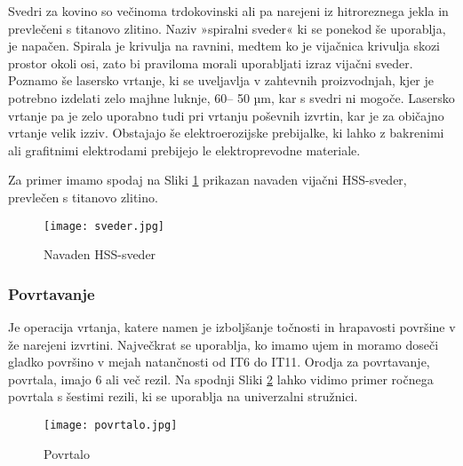 Svedri za kovino so večinoma trdokovinski ali pa narejeni iz
hitroreznega jekla in prevlečeni s titanovo zlitino.
Naziv »spiralni sveder« ki se ponekod še uporablja, je napačen.
Spirala je krivulja na ravnini, medtem ko je vijačnica krivulja
skozi prostor okoli osi, zato bi praviloma morali uporabljati
izraz vijačni sveder.
Poznamo še lasersko vrtanje, ki se uveljavlja v zahtevnih
proizvodnjah, kjer je potrebno izdelati zelo majhne luknje,
60-- 50 µm, kar s svedri ni mogoče. Lasersko vrtanje pa je zelo
uporabno tudi pri vrtanju poševnih izvrtin, kar je za običajno
vrtanje velik izziv.
Obstajajo še elektroerozijske prebijalke, ki lahko z bakrenimi ali
grafitnimi elektrodami prebijejo le elektroprevodne materiale.

Za primer imamo spodaj na Sliki \ref{hss_sveder} prikazan navaden
vijačni HSS-sveder, prevlečen s titanovo zlitino.
\begin{figure}[H]
	\begin{center}
		\texttt{[image: sveder.jpg]}
		\caption{Navaden HSS-sveder
			\cite{sveder}}
		\label{hss_sveder}
	\end{center}
\end{figure}
\subsubsection{Povrtavanje}
Je operacija vrtanja, katere namen je izboljšanje točnosti in
hrapavosti površine v že narejeni izvrtini. Največkrat se
uporablja, ko imamo ujem in moramo doseči gladko površino v
mejah natančnosti od IT6 do IT11. Orodja za povrtavanje, povrtala,
imajo 6 ali več rezil. Na spodnji Sliki \ref{povrtalo} lahko vidimo
primer ročnega povrtala s šestimi rezili, ki se uporablja na
univerzalni stružnici.
\begin{figure}[H]
	\begin{center}
		\texttt{[image: povrtalo.jpg]}
		\caption{Povrtalo
			\cite{sts_arhiv}}
		\label{povrtalo}
	\end{center}
\end{figure}


